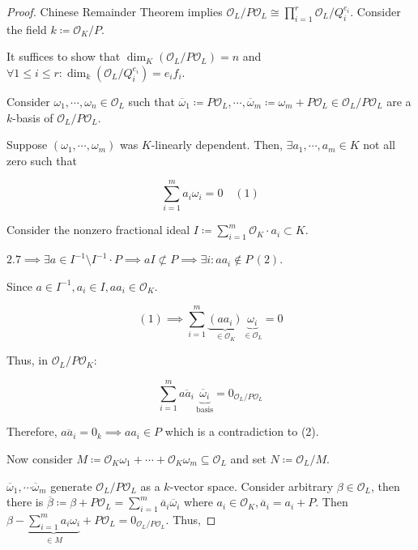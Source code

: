 \documentclass[openany]{amsbook}
\numberwithin{section}{chapter}
\theoremstyle{definition}
\begin{document}
\begin{proof}
    Chinese Remainder Theorem implies \(\mathcal{O}_L / P \mathcal{O}_L \cong \prod_{i=1}^r \mathcal{O}_L / Q_i^{e_i}\). Consider the field \(k\coloneqq \mathcal{O}_K / P\).

    It suffices to show that \(\dim_K (\mathcal{O}_L / P\mathcal{O}_L) = n\) and \(\forall 1 \leq i \leq r: \dim_k(\mathcal{O}_L / Q_i^{e_i}) = e_i f_i\). 

    Consider \(\omega_1 , \cdots , \omega_n \in \mathcal{O}_L\) such that \(\overline{\omega}_1 \coloneqq P\mathcal{O}_L, \cdots , \overline{\omega}_m \coloneqq \omega_m + P\mathcal{O}_L \in \mathcal{O}_L / P \mathcal{O}_L\) are a \(k\)-basis of \(\mathcal{O}_L / P \mathcal{O}_L\). 

    Suppose \((\omega_1, \cdots , \omega_m)\) was \(K\)-linearly dependent. Then, \(\exists a_1, \cdots , a_m \in K\) not all zero such that
    
    \[\sum_{i=1}^m a_i \omega_i=0 \quad (1)\]
    
    Consider the nonzero fractional ideal \(I \coloneqq \sum_{i=1}^m \mathcal{O}_K \cdot a_i \subset K\).

    \(2.7 \implies \exists a\in I ^{-1} \setminus I ^{-1} \cdot P \implies aI \not\subset P \implies \exists i : aa_i \notin P\,(2)\). 

    Since \(a\in I ^{-1} , a_i \in I, a a_i \in \mathcal{O}_K\). 

    \[
        (1) \implies \sum_{i=1}^m \underbrace{(a a_i)}_{\in \mathcal{O}_K} \underbrace{\omega_i}_{\in \mathcal{O}_L} = 0 
    \] 

    Thus, in \(\mathcal{O}_L / P \mathcal{O}_K\): 

    \[
        \sum_{i=1}^m \overline{a a_i} \, \underbrace{\overline{\omega}_i}_{\text{basis}} = 0_{\mathcal{O}_L / P \mathcal{O}_L}
    \]

    Therefore, \(\overline{a a_i} = 0_k \implies a a_i \in P\) which is a contradiction to (2).

    Now consider \(M\coloneqq \mathcal{O}_K \omega_1 + \cdots + \mathcal{O} _K \omega_m \subseteq \mathcal{O}_L\) and set \(N \coloneqq \mathcal{O}_L / M\).

    \(\overline{\omega}_1, \cdots \overline{\omega}_m\) generate \(\mathcal{O}_L / P \mathcal{O}_L\) as a \(k\)-vector space. Consider arbitrary \(\beta \in \mathcal{O}_L\), then there is \(\overline{\beta} \coloneqq \beta + P \mathcal{O}_L = \sum_{i=1}^m \overline{a}_i \overline{\omega}_i\) where \(a_i\in \mathcal{O}_K, \overline{a}_i = a_i + P\). Then \(\beta - \underbrace{\sum_{i=1}^m a_i \omega_i}_{\in M} + P \mathcal{O}_L = 0_{\mathcal{O}_L / P \mathcal{O}_L}\). Thus, 


\end{proof}
\end{document}
